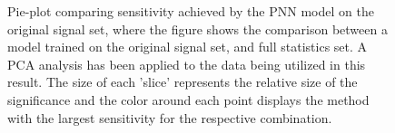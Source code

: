 \begin{figure}[H]
    \caption[Pie-plot comparing sensitivity achieved by the \acs{PNN} model on the original signal set, where the figure shows the comparison between a model trained 
    on the original signal set, and full statistics set.]{Pie-plot comparing sensitivity achieved by the \acs{PNN} model on the original signal set, where the figure 
    shows the comparison between a model trained on the original signal set, and full statistics set. A \ac{PCA} analysis has been applied to the data being utilized 
    in this result. The size of each 'slice' represents the relative size of the significance and the color around each 
    point displays the method with the largest sensitivity for the respective combination.}
    \label{fig:BigVsLittleSetPNN}
\end{figure}
\newpage